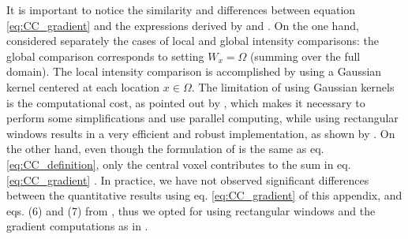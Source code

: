 It is important to notice the similarity and differences between equation \eqref{eq:CC_gradient} and the expressions derived by \cite{Hermosillo2004}
and \cite{Avants2008}. On the one hand, \cite{Hermosillo2004} considered separately the cases of local and global intensity comparisons: the global comparison corresponds to setting $W_{x} = \Omega$ (summing over the full domain). The local intensity comparison is accomplished by using a Gaussian kernel centered at each location $x\in\Omega$. The limitation of using Gaussian kernels is the computational cost, as pointed out by \cite{Hermosillo2004}, which makes it necessary to perform some simplifications and use parallel computing, while using rectangular windows results in a very efficient and robust implementation, as shown by \cite{Avants2008}. On the other hand, even though the formulation of \cite{Avants2008} is the same as eq. \eqref{eq:CC_definition}, only the central voxel contributes to the sum in eq. \eqref{eq:CC_gradient} \citep[see][eqs. 6, 7]{Avants2008}. In practice, we have not observed significant differences between the quantitative results using eq. \eqref{eq:CC_gradient} of this appendix, and eqs. (6) and (7) from \cite{Avants2008}, thus we opted for using rectangular windows and the gradient computations as in \cite{Avants2008}.



